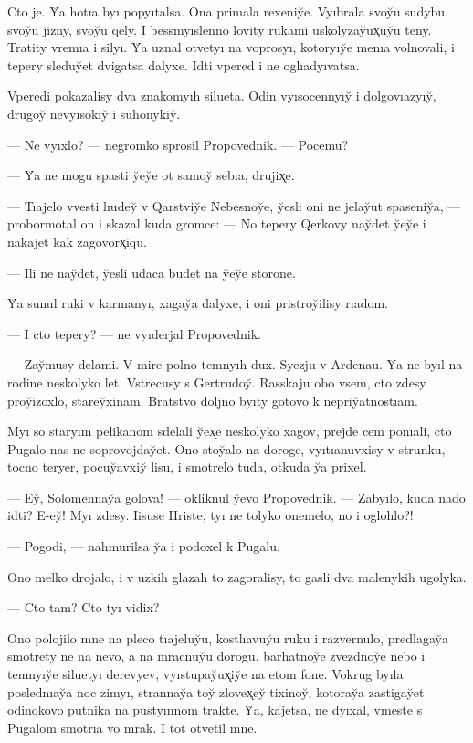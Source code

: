 \documentclass[10pt]{book}
\begin{document}
Cto je. Y̆a hotıa byı popyıtalsa. Ona prinıala rexeniy̆e. Vyıbrala svoy̆u sudybu, svoy̆u jizny, svoy̆u qely. I bessmyıslenno lovity rukami uskolyzay̆ux̨uy̆u teny. Tratity vremıa i silyı. Y̆a uznal otvetyı na voprosyı, kotoryıy̆e menıa volnovali, i tepery sleduy̆et dvigatsa dalyxe. Idti vpered i ne oglıadyıvatsa.

Vperedi pokazalisy dva znakomyıh silueta. Odin vyısocennyıy̆ i dolgovıazyıy̆, drugoy̆ nevyısokiy̆ i suhonykiy̆.

— Ne vyıxlo? — negromko sprosil Propovednik. — Pocemu?

— Y̆a ne mogu spasti y̆ey̆e ot samoy̆ sebıa, drujix̨e.

— Tıajelo vvesti lıudey̆ v Qarstviy̆e Nebesnoy̆e, y̆esli oni ne jelay̆ut spaseniy̆a, — probormotal on i skazal kuda gromce: — No tepery Qerkovy nay̆det y̆ey̆e i nakajet kak zagovorx̨iqu.

— Ili ne nay̆det, y̆esli udaca budet na y̆ey̆e storone.

Y̆a sunul ruki v karmanyı, xagay̆a dalyxe, i oni pristroy̆ilisy rıadom.

— I cto tepery? — ne vyıderjal Propovednik.

— Zay̆musy delami. V mire polno temnyıh dux. Syezju v Ardenau. Y̆a ne byıl na rodine neskolyko let. Vstrecusy s Gertrudoy̆. Rasskaju obo vsem, cto zdesy proy̆izoxlo, starey̆xinam. Bratstvo doljno byıty gotovo k nepriy̆atnostıam.

Myı so staryım pelikanom sdelali y̆ex̨e neskolyko xagov, prejde cem ponıali, cto Pugalo nas ne soprovojday̆et. Ono stoy̆alo na doroge, vyıtıanuvxisy v strunku, tocno teryer, pocuy̆avxiy̆ lisu, i smotrelo tuda, otkuda y̆a prixel.

— Ey̆, Solomennay̆a golova! — okliknul y̆evo Propovednik. — Zabyılo, kuda nado idti? E-ey̆! Myı zdesy. Iisuse Hriste, tyı ne tolyko onemelo, no i oglohlo?!

— Pogodi, — nahmurilsa y̆a i podoxel k Pugalu.

Ono melko drojalo, i v uzkih glazah to zagoralisy, to gasli dva malenykih ugolyka.

— Cto tam? Cto tyı vidix?

Ono polojilo mne na pleco tıajeluy̆u, kostlıavuy̆u ruku i razvernulo, predlagay̆a smotrety ne na nevo, a na mracnuy̆u dorogu, barhatnoy̆e zvezdnoy̆e nebo i temnyıy̆e siluetyı derevyev, vyıstupay̆ux̨iy̆e na etom fone. Vokrug byıla poslednıay̆a noc zimyı, strannay̆a toy̆ zlovex̨ey̆ tixinoy̆, kotoray̆a zastigay̆et odinokovo putnika na pustyınnom trakte. Y̆a, kajetsa, ne dyıxal, vmeste s Pugalom smotrıa vo mrak. I tot otvetil mne.
\end{document}
